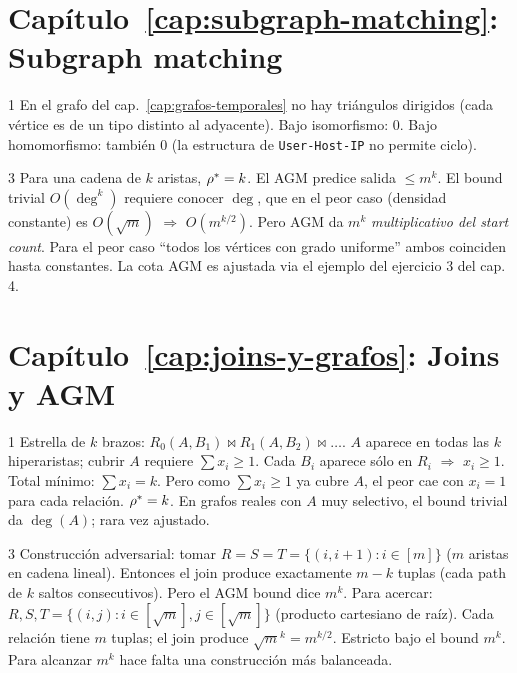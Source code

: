 \section*{Capítulo~\ref{cap:subgraph-matching}: Subgraph matching}

\begin{solucion}{1}
En el grafo del cap.~\ref{cap:grafos-temporales} no hay
triángulos dirigidos (cada vértice es de un tipo distinto al
adyacente). Bajo isomorfismo: 0. Bajo homomorfismo: también 0
(la estructura de \texttt{User-Host-IP} no permite ciclo).
\end{solucion}

\begin{solucion}{3}
Para una cadena de \(k\) aristas, \(\rho^{*} = k\). El AGM
predice salida \(\leq m^k\). El bound trivial \(O(\deg^k)\)
requiere conocer \(\deg\), que en el peor caso (densidad
constante) es \(O(\sqrt{m})\) $\Rightarrow$ \(O(m^{k/2})\).
Pero AGM da \(m^k\) \emph{multiplicativo del start count}.
Para el peor caso ``todos los vértices con grado uniforme''
ambos coinciden hasta constantes. La cota AGM es ajustada via
el ejemplo del ejercicio 3 del cap. 4.
\end{solucion}

\section*{Capítulo~\ref{cap:joins-y-grafos}: Joins y AGM}

\begin{solucion}{1}
Estrella de \(k\) brazos:
\(R_0(A, B_1) \bowtie R_1(A, B_2) \bowtie \dots\). \(A\) aparece en
todas las \(k\) hiperaristas; cubrir \(A\) requiere \(\sum x_i
\geq 1\). Cada \(B_i\) aparece sólo en \(R_i\) $\Rightarrow$
\(x_i \geq 1\). Total mínimo: \(\sum x_i = k\). Pero como
\(\sum x_i \geq 1\) ya cubre \(A\), el peor cae con \(x_i = 1\)
para cada relación. \(\rho^{*} = k\). En grafos reales con \(A\)
muy selectivo, el bound trivial da \(\deg(A)\); rara vez ajustado.
\end{solucion}

\begin{solucion}{3}
Construcción adversarial: tomar \(R = S = T = \{(i, i+1) : i \in
[m]\}\) (\(m\) aristas en cadena lineal). Entonces el join produce
exactamente \(m - k\) tuplas (cada path de \(k\) saltos
consecutivos). Pero el AGM bound dice \(m^k\). Para acercar:
\(R, S, T = \{(i, j) : i \in [\sqrt{m}], j \in [\sqrt{m}]\}\)
(producto cartesiano de raíz). Cada relación tiene \(m\) tuplas;
el join produce \(\sqrt{m}^k = m^{k/2}\). Estricto bajo el bound
\(m^k\). Para alcanzar \(m^k\) hace falta una construcción más
balanceada.
\end{solucion}

